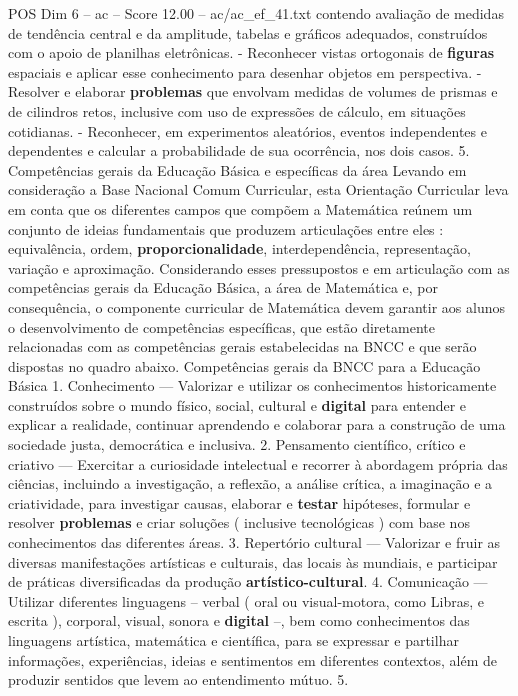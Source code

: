 \begin{textsample}{POS Dim 6 – ac – Score 12.00 – ac/ac\_ef\_41.txt}
contendo avaliação de medidas de tendência central e da amplitude, tabelas e gráficos adequados, construídos com o apoio de planilhas eletrônicas. - Reconhecer vistas ortogonais de \textbf{figuras} espaciais e aplicar esse conhecimento para desenhar objetos em perspectiva. - Resolver e elaborar \textbf{problemas} que envolvam medidas de volumes de prismas e de cilindros retos, inclusive com uso de expressões de cálculo, em situações cotidianas. - Reconhecer, em experimentos aleatórios, eventos independentes e dependentes e calcular a probabilidade de sua ocorrência, nos dois casos. 5.
Competências gerais da Educação Básica e específicas da área Levando em consideração a Base Nacional Comum Curricular, esta Orientação Curricular leva em conta que os diferentes campos que compõem a Matemática reúnem um conjunto de ideias fundamentais que produzem articulações entre eles : equivalência, ordem, \textbf{proporcionalidade}, interdependência, representação, variação e aproximação.
Considerando esses pressupostos e em articulação com as competências gerais da Educação Básica, a área de Matemática e, por consequência, o componente curricular de Matemática devem garantir aos alunos o desenvolvimento de competências específicas, que estão diretamente relacionadas com as competências gerais estabelecidas na BNCC e que serão dispostas no quadro abaixo.
Competências gerais da BNCC para a Educação Básica 1.
Conhecimento — Valorizar e utilizar os conhecimentos historicamente construídos sobre o mundo físico, social, cultural e \textbf{digital} para entender e explicar a realidade, continuar aprendendo e colaborar para a construção de uma sociedade justa, democrática e inclusiva. 2.
Pensamento científico, crítico e criativo — Exercitar a curiosidade intelectual e recorrer à abordagem própria das ciências, incluindo a investigação, a reflexão, a análise crítica, a imaginação e a criatividade, para investigar causas, elaborar e \textbf{testar} hipóteses, formular e resolver \textbf{problemas} e criar soluções ( inclusive tecnológicas ) com base nos conhecimentos das diferentes áreas. 3.
Repertório cultural — Valorizar e fruir as diversas manifestações artísticas e culturais, das locais às mundiais, e participar de práticas diversificadas da produção \textbf{artístico-cultural}. 4.
Comunicação — Utilizar diferentes linguagens – verbal ( oral ou visual-motora, como Libras, e escrita ), corporal, visual, sonora e \textbf{digital} –, bem como conhecimentos das linguagens artística, matemática e científica, para se expressar e partilhar informações, experiências, ideias e sentimentos em diferentes contextos, além de produzir sentidos que levem ao entendimento mútuo. 5.

\end{textsample}
